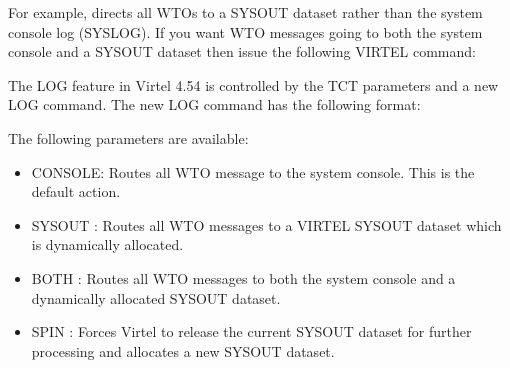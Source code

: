 \documentclass[letterpaper,10pt,english]{sphinxmanual}
\begin{document}
\begin{sphinxVerbatim}[commandchars=\\\{\}]
\end{sphinxVerbatim}

\sphinxAtStartPar
For example,  directs all WTOs to a SYSOUT dataset rather than the system console log (SYSLOG). If you want WTO messages going to both the system console and a SYSOUT dataset then issue the following VIRTEL command:

\begin{sphinxVerbatim}[commandchars=\\\{\}]
 
\end{sphinxVerbatim}

\ignorespaces 
\sphinxAtStartPar
The LOG feature in Virtel 4.54 is controlled by the TCT parameters and a new LOG command. The new LOG command has the following format:

\begin{sphinxVerbatim}[commandchars=\\\{\}]
        
\end{sphinxVerbatim}

\sphinxAtStartPar
{}

\sphinxAtStartPar
The following parameters are available:
\begin{itemize}
\item {} 
\sphinxAtStartPar
CONSOLE: Routes all WTO message to the system console. This is the default action.

\item {} 
\sphinxAtStartPar
SYSOUT : Routes all WTO messages to a VIRTEL SYSOUT dataset which is dynamically allocated.

\item {} 
\sphinxAtStartPar
BOTH : Routes all WTO messages to both the system console and a dynamically allocated SYSOUT dataset.

\item {} 
\sphinxAtStartPar
SPIN : Forces Virtel to release the current SYSOUT dataset for further processing and allocates a new SYSOUT dataset.

\end{itemize}
\end{document}
